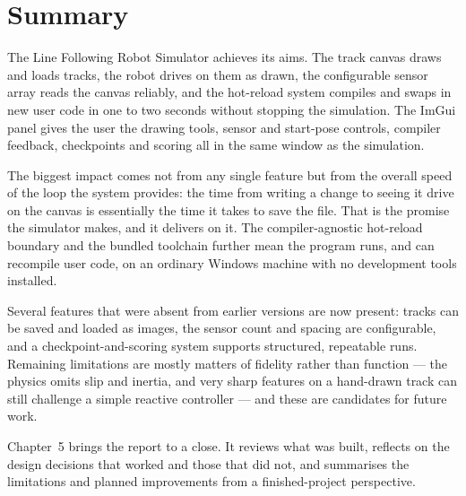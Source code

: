 \section{Summary}

The Line Following Robot Simulator achieves its aims. The track canvas draws and loads tracks, the robot drives on them as drawn, the configurable sensor array reads the canvas reliably, and the hot-reload system compiles and swaps in new user code in one to two seconds without stopping the simulation. The ImGui panel gives the user the drawing tools, sensor and start-pose controls, compiler feedback, checkpoints and scoring all in the same window as the simulation.

The biggest impact comes not from any single feature but from the overall speed of the loop the system provides: the time from writing a change to seeing it drive on the canvas is essentially the time it takes to save the file. That is the promise the simulator makes, and it delivers on it. The compiler-agnostic hot-reload boundary and the bundled toolchain further mean the program runs, and can recompile user code, on an ordinary Windows machine with no development tools installed.

Several features that were absent from earlier versions are now present: tracks can be saved and loaded as images, the sensor count and spacing are configurable, and a checkpoint-and-scoring system supports structured, repeatable runs. Remaining limitations are mostly matters of fidelity rather than function --- the physics omits slip and inertia, and very sharp features on a hand-drawn track can still challenge a simple reactive controller --- and these are candidates for future work.

Chapter~5 brings the report to a close. It reviews what was built, reflects on the design decisions that worked and those that did not, and summarises the limitations and planned improvements from a finished-project perspective.

\clearpage
